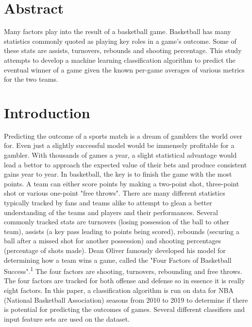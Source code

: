 \documentclass[12pt]{article}%
\begin{document}
\titlepage{}


\tableofcontents

\section{Abstract}
Many factors play into the result of a basketball game. Basketball has many statistics commonly quoted as playing key roles in a game's outcome. Some of these stats are assists, turnovers, rebounds and shooting percentage. This study attempts to develop a machine learning classification algorithm to predict the eventual winner of a game given the known per-game averages of various metrics for the two teams.

\section{Introduction}
Predicting the outcome of a sports match is a dream of gamblers the world over for. Even just a slightly successful model would be immensely profitable for a gambler. With thousands of games a year, a slight statistical advantage would lead a bettor to approach the expected value of their bets and produce consistent gains year to year.
\newline\newline
In basketball, the key is to finish the game with the most points. A team can either score points by making a two-point shot, three-point shot or various one-point "free throws". There are many different statistics typically tracked by fans and teams alike to attempt to glean a better understanding of the teams and players and their performances. Several commonly tracked stats are turnovers (losing possession of the ball to other team), assists (a key pass leading to points being scored), rebounds (securing a ball after a missed shot for another possession) and shooting percentages (percentage of shots made). Dean Oliver famously developed his model for determining how a team wins a game, called the "Four Factors of Basketball Success".\textsuperscript{1} The four factors are shooting, turnovers, rebounding and free throws. The four factors are tracked for both offense and defense so in essence it is really eight factors.
\newline\newline
In this paper, a classification algorithm is run on data for NBA (National Basketball Association) seasons from 2010 to 2019 to determine if there is potential for predicting the outcomes of games. Several different classifiers and input feature sets are used on the dataset.
\end{document}
